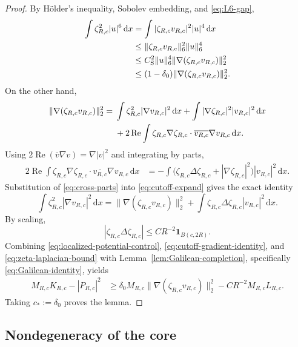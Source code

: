 \documentclass{interact}
\numberwithin{equation}{section}
\theoremstyle{plain}
\theoremstyle{definition}
\theoremstyle{remark}
\newcommand{\Rea}{\operatorname{Re}}
\newcommand{\cS}{C_{\mathrm S}}
\newcommand{\dd}{\,\mathrm d}
\newcommand{\one}{\mathbf 1}
\begin{document}
\begin{proof}
By H\"older's inequality, Sobolev embedding, and \eqref{eq:L6-gap},
\begin{align}
 \int\zeta_{R,c}^2|u|^6\dd x
 &=\int|\zeta_{R,c}v_{R,c}|^2|u|^4\dd x
 \notag\\
 &\le\|\zeta_{R,c}v_{R,c}\|_6^2\|u\|_6^4
 \notag\\
 &\le \cS^2\|u\|_6^4
 \|\nabla(\zeta_{R,c}v_{R,c})\|_2^2
 \notag\\
 &\le(1-\delta_0)
 \|\nabla(\zeta_{R,c}v_{R,c})\|_2^2.
 \label{eq:localized-potential-control}
\end{align}
On the other hand,
\begin{align}
 \|\nabla(\zeta_{R,c}v_{R,c})\|_2^2
 ={}&\int\zeta_{R,c}^2|\nabla v_{R,c}|^2\dd x
 +\int|\nabla\zeta_{R,c}|^2|v_{R,c}|^2\dd x
 \notag\\
 &+2\Rea\int
 \zeta_{R,c}\nabla\zeta_{R,c}\cdot
 \overline{v_{R,c}}\nabla v_{R,c}\dd x.
 \label{eq:cutoff-expand}
\end{align}
Using $2\Rea(\overline v\nabla v)=\nabla|v|^2$ and integrating by parts,
\begin{align}
 2\Rea\int
 \zeta_{R,c}\nabla\zeta_{R,c}\cdot
 \overline{v_{R,c}}\nabla v_{R,c}\dd x
 &=-\int\bigl(\zeta_{R,c}\Delta\zeta_{R,c}
 +|\nabla\zeta_{R,c}|^2\bigr)|v_{R,c}|^2\dd x.
 \label{eq:cross-parts}
\end{align}
Substitution of \eqref{eq:cross-parts} into \eqref{eq:cutoff-expand} gives the exact identity
\begin{equation}\label{eq:cutoff-gradient-identity}
 \int\zeta_{R,c}^2|\nabla v_{R,c}|^2\dd x
 =\|\nabla(\zeta_{R,c}v_{R,c})\|_2^2
 +\int\zeta_{R,c}\Delta\zeta_{R,c}|v_{R,c}|^2\dd x.
\end{equation}
By scaling,
\begin{equation}\label{eq:zeta-laplacian-bound}
 |\zeta_{R,c}\Delta\zeta_{R,c}|
 \le CR^{-2}\one_{B(c,2R)}.
\end{equation}
Combining \eqref{eq:localized-potential-control}, \eqref{eq:cutoff-gradient-identity}, and \eqref{eq:zeta-laplacian-bound} with Lemma~\ref{lem:Galilean-completion}, specifically \eqref{eq:Galilean-identity}, yields
\begin{align*}
 M_{R,c}K_{R,c}-|P_{R,c}|^2
 &\ge \delta_0M_{R,c}
 \|\nabla(\zeta_{R,c}v_{R,c})\|_2^2
 -CR^{-2}M_{R,c}L_{R,c}.
\end{align*}
Taking $c_*:=\delta_0$ proves the lemma.
\end{proof}

\subsection{Nondegeneracy of the core}
\end{document}
